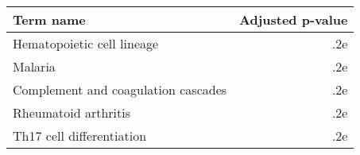 \begin{tabular}{lr}
\toprule
                          Term name &  Adjusted p-value \\
\midrule
         Hematopoietic cell lineage &               .2e \\
                            Malaria &               .2e \\
Complement and coagulation cascades &               .2e \\
               Rheumatoid arthritis &               .2e \\
          Th17 cell differentiation &               .2e \\
\bottomrule
\end{tabular}
